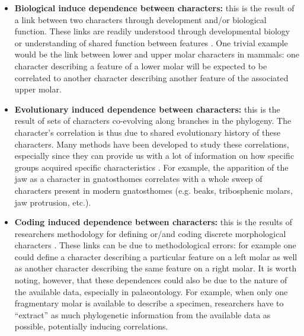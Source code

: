 \documentclass[12pt,letterpaper]{article}
\begin{document}
\begin{itemize}


    \item \textbf{Biological induce dependence between characters:} this is the result of a link between two characters through development and/or biological function.
    These links are readily understood through developmental biology or understanding of shared function between features \citep{goswami2006morphological,goswami2010,goswami2014macroevolutionary}.
    One trivial example would be the link between lower and upper molar characters in mammals: one character describing a feature of a lower molar will be expected to be correlated to another character describing another feature of the associated upper molar.

    \item \textbf{Evolutionary induced dependence between characters:} this is the result of sets of characters co-evolving along branches in the phylogeny.
    The character's correlation is thus due to shared evolutionary history of these characters.
    Many methods have been developed to study these correlations, especially since they can provide us with a lot of information on how specific groups acquired specific characteristics \citep{Lande1983,Maddison1990,Pagel1994,Pagel2006,Grabowski2016}.
    For example, the apparition of the jaw as a character in gnatosthomes correlates with a whole sweep of characters present in modern gnatosthomes (e.g. beaks, tribosphenic molars, jaw protrusion, etc.). %


    \item \textbf{Coding induced dependence between characters:} this is the results of researchers methodology for defining or/and coding discrete morphological characters \citep{Brazeau2011,simoes2017giant}.
    These links can be due to methodological errors: for example one could define a character describing a particular feature on a left molar as well as another character describing the same feature on a right molar.
    It is worth noting, however, that these dependences could also be due to the nature of the available data, especially in palaeontology.
    For example, when only one fragmentary molar is available to describe a specimen, researchers have to ``extract'' as much phylogenetic information from the available data as possible, potentially inducing correlations.
\end{itemize}
\end{document}
